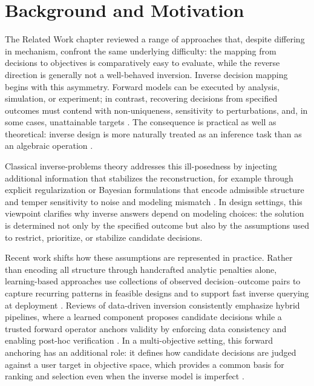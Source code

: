 
\chapter{Background and Motivation}\label{chap:Background}

The Related Work chapter reviewed a range of approaches that, despite differing in mechanism, confront the same underlying difficulty: the mapping from decisions to objectives is comparatively easy to evaluate, while the reverse direction is generally not a well-behaved inversion. Inverse decision mapping begins with this asymmetry. Forward models can be executed by analysis, simulation, or experiment; in contrast, recovering decisions from specified outcomes must contend with non-uniqueness, sensitivity to perturbations, and, in some cases, unattainable targets \cite{Stuart2010}. The consequence is practical as well as theoretical: inverse design is more naturally treated as an inference task than as an algebraic operation \cite{Arridge2019}.

Classical inverse-problems theory addresses this ill-posedness by injecting additional information that stabilizes the reconstruction, for example through explicit regularization or Bayesian formulations that encode admissible structure and temper sensitivity to noise and modeling mismatch \cite{BenningBurger2018}. In design settings, this viewpoint clarifies why inverse answers depend on modeling choices: the solution is determined not only by the specified outcome but also by the assumptions used to restrict, prioritize, or stabilize candidate decisions.



Recent work shifts how these assumptions are represented in practice. Rather than encoding all structure through handcrafted analytic penalties alone, learning-based approaches use collections of observed decision--outcome pairs to capture recurring patterns in feasible designs and to support fast inverse querying at deployment \cite{Liu2025Review}. Reviews of data-driven inversion consistently emphasize hybrid pipelines, where a learned component proposes candidate decisions while a trusted forward operator anchors validity by enforcing data consistency and enabling post-hoc verification \cite{Liu2018_ACSPhotonics}. In a multi-objective setting, this forward anchoring has an additional role: it defines how candidate decisions are judged against a user target in objective space, which provides a common basis for ranking and selection even when the inverse model is imperfect \cite{Xu2025}.

